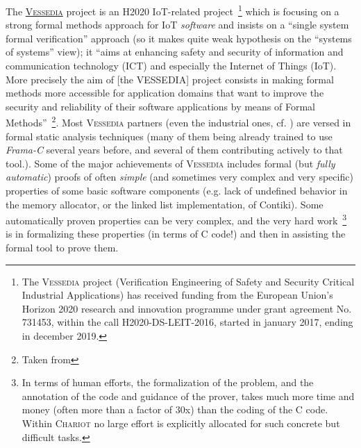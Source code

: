The \href{http://vessedia.eu/}{\textsc{Vessedia}}  project is an H2020 
IoT-related project~\footnote{The \textsc{Vessedia} project (Verification
  Engineering of Safety and Security Critical Industrial Applications)
  has received funding from the European Union's Horizon 2020 research
  and innovation programme under grant agreement No. 731453, within
  the call H2020-DS-LEIT-2016, started in january 2017, ending in
  december 2019.} which is focusing on a strong formal methods
approach for IoT \emph{software} and insists on a ``single system
formal verification'' approach (so it makes quite weak hypothesis on
the ``systems of systems'' view); it ``aims at enhancing safety and
security of information and communication technology (ICT) and
especially the Internet of Things (IoT). More precisely the aim of
[the VESSEDIA] project consists in making formal methods more
accessible for application domains that want to improve the security
and reliability of their software applications by means of Formal
Methods''~\footnote{Taken from
  }. Most \textsc{Vessedia} partners
(even the industrial ones, cf. \cite{Berkes:2018:Vessedia-approach}) are versed in formal static analysis
techniques (many of them being already trained to use \emph{Frama-C}
several years before, and several of them contributing actively to
that tool.). Some of the major achievements of \textsc{Vessedia}
includes formal (but \emph{fully automatic}) proofs of often
\emph{simple} (and sometimes very complex and very specific)
properties of some basic software components (e.g. lack of undefined
behavior in the memory allocator, or the linked list implementation,
of Contiki). Some automatically proven properties can be very complex,
and the very hard work~\footnote{In terms of human efforts, the
  formalization of the problem, and the annotation of the code and
  guidance of the prover, takes much more time and money (often more
  than a factor of 30x) than the coding of the C code. Within
  \textsc{Chariot} no large effort is explicitly allocated for such
  concrete but difficult tasks.}  is in formalizing these properties
(in terms of C code!)  and then in assisting the formal tool to prove
them.


